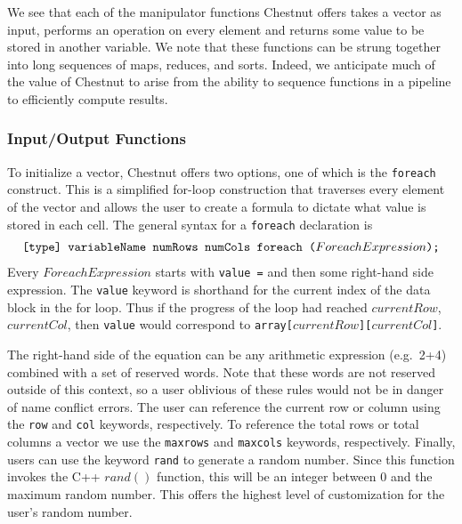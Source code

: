 \documentclass[twocolumn]{article}
\renewcommand{\|}{\origbar} %
\newcommand{\code}[1]{\texttt{#1}}
\begin{document}
We see that each of the manipulator functions Chestnut offers takes a vector as input, performs an operation on every element and returns some value to be stored in another variable. We note that these functions can be strung together into long sequences of maps, reduces, and sorts. Indeed, we anticipate much of the value of Chestnut to arise from the ability to sequence functions in a pipeline to efficiently compute results.

\subsubsection{Input/Output Functions}
\label{sec:iofunctions}

To initialize a vector, Chestnut offers two options, one of which is the \code{foreach} construct. This is a simplified for-loop construction that traverses every element of the vector and allows the user to create a formula to dictate what value is stored in each cell. The general syntax for a \code{foreach} declaration is
\begin{align*}
  \if@twocolumn
    \code{[type]}& \code{ variableName numRows numCols } \\ &\code{foreach ($ForeachExpression$);}
  \else
    \code{[type] variableName numRows numCols foreach ($ForeachExpression$);}
  \fi
\end{align*}
Every $ForeachExpression$ starts with \code{value =} and then some right-hand side expression. The \code{value} keyword is shorthand for the current index of the data block in the for loop. Thus if the progress of the loop had reached $currentRow$, $currentCol$, then \code{value} would correspond to \code{array[$currentRow$][$currentCol$]}.

The right-hand side of the equation can be any arithmetic expression (e.g.\ 2+4) combined with a set of reserved words. Note that these words are not reserved outside of this context, so a user oblivious of these rules would not be in danger of name conflict errors. The user can reference the current row or column using the \code{row} and \code{col} keywords, respectively. To reference the total rows or total columns a vector we use the \code{maxrows} and \code{maxcols} keywords, respectively. Finally, users can use the keyword \code{rand} to generate a random number. Since this function invokes the C++ $rand()$ function, this will be an integer between 0 and the maximum random number. This offers the highest level of customization for the user's random number.
\end{document}
